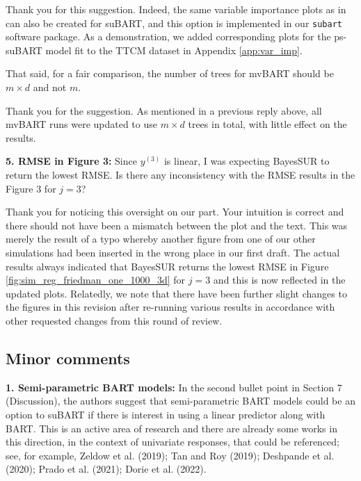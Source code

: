 \documentclass{article}
\begin{document}
Thank you for this suggestion. Indeed, the same variable importance plots as in \citet{chipman2010bart} can also be created for suBART, and this option is implemented in our \texttt{subart} software package. As a demonstration, we added corresponding plots for the ps-suBART model fit to the TTCM dataset in Appendix \ref{app:var_imp}.

\begin{mdframed}
That said, for a fair comparison, the number of trees for mvBART should be $m\times d$ and not
$m$.
\end{mdframed}

Thank you for the suggestion. As mentioned in a previous reply above, all mvBART runs were updated to use $m \times d$ trees in total, with little effect on the results.

\begin{mdframed}
\textbf{5. RMSE in Figure 3:} Since $y^{(3)}$ is linear, I was expecting BayesSUR to return the lowest RMSE. Is there any inconsistency with the RMSE results in the Figure 3 for $j = 3$?
\end{mdframed}
Thank you for noticing this oversight on our part. Your intuition is correct and there should not have been a mismatch between the plot and the text. This was merely the result of a typo whereby another figure from one of our other simulations had been inserted in the wrong place in our first draft. The actual results always indicated that BayesSUR returns the lowest RMSE in Figure \ref{fig:sim_reg_friedman_one_1000_3d} for $j=3$ and this is now reflected in the updated plots. Relatedly, we note that there have been further slight changes to the figures in this revision after re-running various results in accordance with other requested changes from this round of review.

\subsection{Minor comments}

\begin{mdframed}
   \textbf{1. Semi-parametric BART models:}  In the second bullet point in Section 7 (Discussion), the authors suggest that semi-parametric BART models could be an option to suBART if there is interest in using a linear predictor along with BART. This is an active area of research and there are already some works in this direction, in the context of univariate responses, that could be referenced; see, for example, Zeldow et al. (2019); Tan and Roy (2019); Deshpande et al. (2020); Prado et al. (2021); Dorie et al. (2022).
\end{mdframed}
\end{document}
